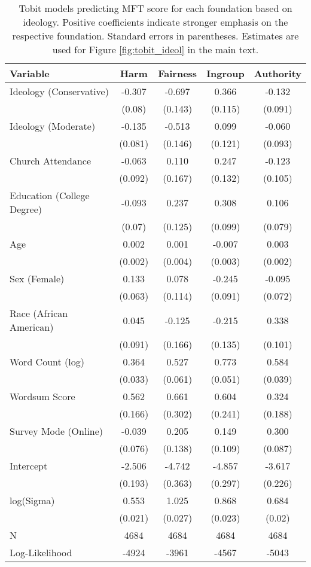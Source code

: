 \begin{table}[ht]
\centering
\caption{Tobit models predicting MFT score for each foundation based 
           on ideology. Positive coefficients indicate stronger emphasis on the respective 
           foundation. Standard errors in parentheses. Estimates are used for Figure 
           \ref{fig:tobit_ideol} in the main text.} 
\label{tab:tobit_ideol}
\begingroup\footnotesize
\begin{tabular}{lcccc}
  \hline
Variable & Harm & Fairness & Ingroup & Authority \\ 
  \hline
Ideology (Conservative) & -0.307 & -0.697 &  0.366 & -0.132 \\ 
   & (0.08) & (0.143) & (0.115) & (0.091) \\ 
  Ideology (Moderate) & -0.135 & -0.513 &  0.099 & -0.060 \\ 
   & (0.081) & (0.146) & (0.121) & (0.093) \\ 
  Church Attendance & -0.063 &  0.110 &  0.247 & -0.123 \\ 
   & (0.092) & (0.167) & (0.132) & (0.105) \\ 
  Education (College Degree) & -0.093 &  0.237 &  0.308 &  0.106 \\ 
   & (0.07) & (0.125) & (0.099) & (0.079) \\ 
  Age &  0.002 &  0.001 & -0.007 &  0.003 \\ 
   & (0.002) & (0.004) & (0.003) & (0.002) \\ 
  Sex (Female) &  0.133 &  0.078 & -0.245 & -0.095 \\ 
   & (0.063) & (0.114) & (0.091) & (0.072) \\ 
  Race (African American) &  0.045 & -0.125 & -0.215 &  0.338 \\ 
   & (0.091) & (0.166) & (0.135) & (0.101) \\ 
  Word Count (log) &  0.364 &  0.527 &  0.773 &  0.584 \\ 
   & (0.033) & (0.061) & (0.051) & (0.039) \\ 
  Wordsum Score &  0.562 &  0.661 &  0.604 &  0.324 \\ 
   & (0.166) & (0.302) & (0.241) & (0.188) \\ 
  Survey Mode (Online) & -0.039 &  0.205 &  0.149 &  0.300 \\ 
   & (0.076) & (0.138) & (0.109) & (0.087) \\ 
  Intercept & -2.506 & -4.742 & -4.857 & -3.617 \\ 
   & (0.193) & (0.363) & (0.297) & (0.226) \\ 
  log(Sigma) &  0.553 &  1.025 &  0.868 &  0.684 \\ 
   & (0.021) & (0.027) & (0.023) & (0.02) \\ 
   \hline
N & 4684 & 4684 & 4684 & 4684 \\ 
  Log-Likelihood & -4924 & -3961 & -4567 & -5043 \\ 
   \hline
\end{tabular}
\endgroup
\end{table}
